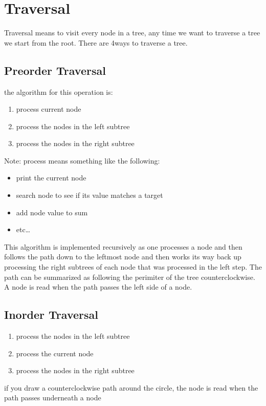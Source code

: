 \documentclass[12pt]{book}
\title{\coursetitle\linebreak\lecturename}
\author{\\Cain Susko\\ 
           \\ \\ \\
      Queen's University 
    \\School of Computing\\}
\begin{document}
\begin{titlepage}
        \maketitle
\end{titlepage}


\section*{Traversal}
Traversal means to visit every node in a tree, any time we want to traverse a tree we start from the root. There are 4ways
        to traverse a tree.

\subsection*{Preorder Traversal}
the algorithm for this operation is:
\begin{enumerate}
        \item process current node
        \item process the nodes in the left subtree
        \item process the nodes in the right subtree
\end{enumerate}

Note: process means something like the following:
\begin{itemize}
        \item print the current node
        \item search node to see if its value matches a target
        \item add node value to sum
        \item  etc\ldots
\end{itemize}

This algorithm is implemented recursively as one processes a node and then follows the path down to the leftmost node
        and then works its way back up processing the right subtrees of each node that was processed in the left step.
The path can be summarized as following the perimiter of the tree counterclockwise. A node is read when the path passes the left
        side of a node.

\subsection*{Inorder Traversal}
\begin{enumerate}
        \item process the nodes in the left subtree
        \item process the current node
        \item process the nodes in the right subtree
\end{enumerate}
if you draw a counterclockwise path around the circle, the node is read when the path passes underneath a node
\end{document}
